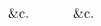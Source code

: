 \documentclass[12pt,preview]{standalone}
\begin{document}
\begin{minipage}{\textwidth}
\[\begin{aligned}
             & \hspace{5ex}\text{\&c.}                                                                                                                                                                                                                                                                                                                                                                                                                                                                                                                                                                                                                                                                                                                                                                                                                                                   &  & \hspace{5ex}\text{\&c.}                                                                                                                                                                                                                                                                                                                                                                                                                                                                                                                                                                                                                                                                                                                                                                                                                                                                                                                                                                          \\

\end{aligned}\]
\end{minipage}
\end{document}
